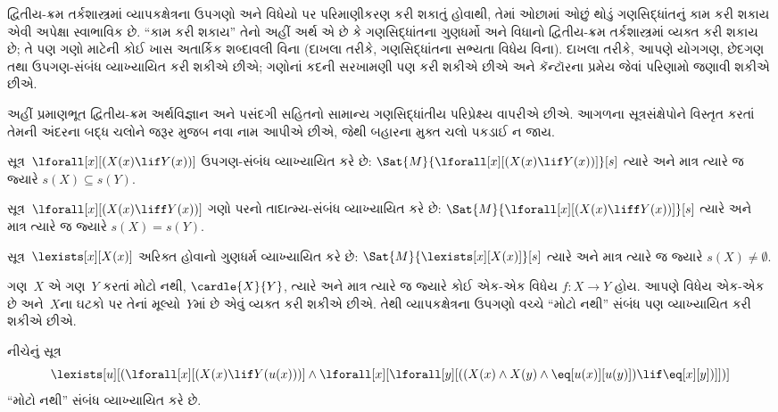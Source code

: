 દ્વિતીય-ક્રમ તર્કશાસ્ત્રમાં વ્યાપકક્ષેત્રના ઉપગણો અને વિધેયો પર
પરિમાણીકરણ કરી શકાતું હોવાથી, તેમાં ઓછામાં ઓછું થોડું ગણસિદ્ધાંતનું
કામ કરી શકાય એવી અપેક્ષા સ્વાભાવિક છે. ``કામ કરી શકાય'' તેનો અહીં
અર્થ એ છે કે ગણસિદ્ધાંતના ગુણધર્મો અને વિધાનો દ્વિતીય-ક્રમ
તર્કશાસ્ત્રમાં વ્યક્ત કરી શકાય છે; તે પણ ગણો માટેની કોઈ ખાસ
અતાર્કિક શબ્દાવલી વિના (દાખલા તરીકે, ગણસિદ્ધાંતના સભ્યતા
વિધેય વિના). દાખલા તરીકે, આપણે યોગગણ, છેદગણ તથા
ઉપગણ-સંબંધ વ્યાખ્યાયિત કરી શકીએ છીએ; ગણોનાં કદની સરખામણી પણ કરી
શકીએ છીએ અને કૅન્ટૉરના પ્રમેય જેવાં પરિણામો જણાવી શકીએ છીએ.

અહીં પ્રમાણભૂત દ્વિતીય-ક્રમ અર્થવિજ્ઞાન અને પસંદગી સહિતનો સામાન્ય
ગણસિદ્ધાંતીય પરિપ્રેક્ષ્ય વાપરીએ છીએ. આગળના સૂત્રસંક્ષેપોને
વિસ્તૃત કરતાં તેમની અંદરના બદ્ધ ચલોને જરૂર મુજબ નવા નામ આપીએ
છીએ, જેથી બહારના મુક્ત ચલો પકડાઈ ન જાય.
\endgroup


\begingroup
\makeatletter{}\makeatother


\label{guunit:OLP-0338}


\begin{prop}
સૂત્ર~$\lforall[x][(X(x) \lif Y(x))]$ ઉપગણ-સંબંધ
વ્યાખ્યાયિત કરે છે: $\Sat{M}{\lforall[x][(X(x) \lif Y(x))]}[s]$
ત્યારે અને માત્ર ત્યારે જ જ્યારે $s(X) \subseteq s(Y)$.
\end{prop}

\begin{prop}
સૂત્ર~$\lforall[x][(X(x) \liff Y(x))]$ ગણો પરનો
તાદાત્મ્ય-સંબંધ વ્યાખ્યાયિત કરે છે: $\Sat{M}{\lforall[x][(X(x)
\liff Y(x))]}[s]$ ત્યારે અને માત્ર ત્યારે જ જ્યારે $s(X) = s(Y)$.
\end{prop}

\begin{prop}
સૂત્ર~$\lexists[x][X(x)]$ અરિક્ત હોવાનો ગુણધર્મ વ્યાખ્યાયિત
કરે છે: $\Sat{M}{\lexists[x][X(x)]}[s]$ ત્યારે અને માત્ર ત્યારે જ
જ્યારે $s(X) \neq \emptyset$.
\end{prop}

ગણ~$X$ એ ગણ~$Y$ કરતાં મોટો નથી, $\cardle{X}{Y}$, ત્યારે અને માત્ર
ત્યારે જ જ્યારે કોઈ એક-એક વિધેય $f\colon X \to Y$ હોય.
આપણે વિધેય એક-એક છે અને~$X$ના ઘટકો પર તેનાં મૂલ્યો~$Y$માં છે એવું
વ્યક્ત કરી શકીએ છીએ. તેથી વ્યાપકક્ષેત્રના ઉપગણો વચ્ચે ``મોટો નથી''
સંબંધ પણ વ્યાખ્યાયિત કરી શકીએ છીએ.

\begin{prop}
નીચેનું સૂત્ર
\[
\lexists[u][(\lforall[x][(X(x) \lif Y(u(x)))] \land \lforall[x][\lforall[y][((X(x) \land X(y) \land \eq[u(x)][u(y)]) \lif
      \eq[x][y])]])]
\]
``મોટો નથી'' સંબંધ વ્યાખ્યાયિત કરે છે.
\end{prop}


